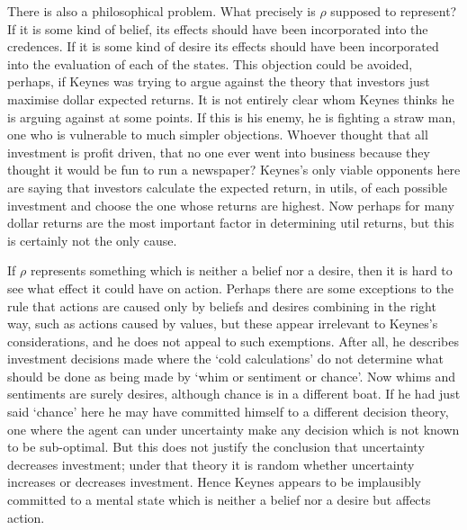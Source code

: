 \documentclass[
  10pt,
  letterpaper,
  DIV=11,
  numbers=noendperiod,
  twoside]{scrartcl}
\begin{document}
There is also a philosophical problem. What precisely is \(\rho\)
supposed to represent? If it is some kind of belief, its effects should
have been incorporated into the credences. If it is some kind of desire
its effects should have been incorporated into the evaluation of each of
the states. This objection could be avoided, perhaps, if Keynes was
trying to argue against the theory that investors just maximise dollar
expected returns. It is not entirely clear whom Keynes thinks he is
arguing against at some points. If this is his enemy, he is fighting a
straw man, one who is vulnerable to much simpler objections. Whoever
thought that all investment is profit driven, that no one ever went into
business because they thought it would be fun to run a newspaper?
Keynes's only viable opponents here are saying that investors calculate
the expected return, in utils, of each possible investment and choose
the one whose returns are highest. Now perhaps for many dollar returns
are the most important factor in determining util returns, but this is
certainly not the only cause.

If \(\rho\) represents something which is neither a belief nor a desire,
then it is hard to see what effect it could have on action. Perhaps
there are some exceptions to the rule that actions are caused only by
beliefs and desires combining in the right way, such as actions caused
by values, but these appear irrelevant to Keynes's considerations, and
he does not appeal to such exemptions. After all, he describes
investment decisions made where the `cold calculations' do not determine
what should be done as being made by `whim or sentiment or chance'. Now
whims and sentiments are surely desires, although chance is in a
different boat. If he had just said `chance' here he may have committed
himself to a different decision theory, one where the agent can under
uncertainty make any decision which is not known to be sub-optimal. But
this does not justify the conclusion that uncertainty decreases
investment; under that theory it is random whether uncertainty increases
or decreases investment. Hence Keynes appears to be implausibly
committed to a mental state which is neither a belief nor a desire but
affects action.
\end{document}
